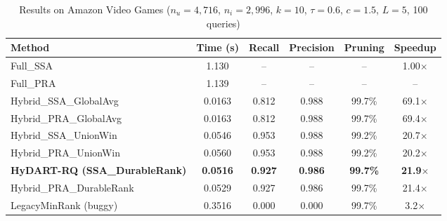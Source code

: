 \begin{table}[htbp]
\centering
\caption{Results on Amazon Video Games ($n_u=4{,}716$, $n_i=2{,}996$, $k=10$, $\tau=0.6$, $c=1.5$, $L=5$, 100 queries)}
\label{tab:amazon_results}
\begin{tabular}{lccccc}
\toprule
\textbf{Method} & \textbf{Time (s)} & \textbf{Recall} & \textbf{Precision} & \textbf{Pruning} & \textbf{Speedup} \\
\midrule
Full\_SSA                 & 1.130  & --    & --     & --     & 1.00$\times$ \\
Full\_PRA                 & 1.139  & --    & --     & --     & -- \\
Hybrid\_SSA\_GlobalAvg    & 0.0163 & 0.812 & 0.988  & 99.7\% & 69.1$\times$ \\
Hybrid\_PRA\_GlobalAvg    & 0.0163 & 0.812 & 0.988  & 99.7\% & 69.4$\times$ \\
Hybrid\_SSA\_UnionWin     & 0.0546 & 0.953 & 0.988  & 99.2\% & 20.7$\times$ \\
Hybrid\_PRA\_UnionWin     & 0.0560 & 0.953 & 0.988  & 99.2\% & 20.2$\times$ \\
\textbf{HyDART-RQ (SSA\_DurableRank)} & \textbf{0.0516} & \textbf{0.927} & \textbf{0.986} & \textbf{99.7\%} & \textbf{21.9$\times$} \\
Hybrid\_PRA\_DurableRank  & 0.0529 & 0.927 & 0.986  & 99.7\% & 21.4$\times$ \\
LegacyMinRank (buggy)     & 0.3516 & 0.000 & 0.000  & 99.7\% & 3.2$\times$ \\
\bottomrule
\end{tabular}
\end{table}

